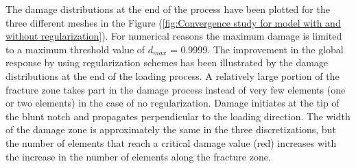 \documentclass[a4paper,12pt,twoside]{report}
\begin{document}
\indent\indent\indent The damage distributions at the end of the process have been plotted for the three different meshes in the Figure (\ref{fig:Convergence study for model with and without regularization}). For numerical reasons the maximum damage is limited to a maximum threshold value of $d_{max}$ = 0.9999. The improvement in the global response by using regularization schemes has been illustrated by the damage distributions at the end of the loading process. A relatively large portion of the fracture zone takes part in the damage process instead of very few elements (one or two elements) in the case of no regularization. Damage initiates at the tip of the blunt notch and propagates perpendicular to the loading direction. The width of the damage zone is approximately the same in the three discretizations, but the number of elements that reach a critical damage value (red) increases with the increase in the number of elements along the fracture zone.
\end{document}
